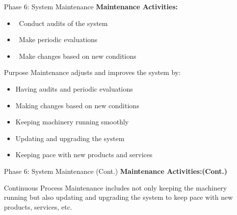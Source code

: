 \documentclass[aspectratio=169]{beamer}
\begin{document}
\begin{frame}{Phase 6: System Maintenance}
    \textbf{Maintenance Activities:}
    \begin{itemize}
        \item\, Conduct audits of the system
        \item\, Make periodic evaluations
        \item \faServer\, Make changes based on new conditions
    \end{itemize} 
    \begin{block}{Purpose}
        Maintenance adjusts and improves the system by:
        \begin{itemize}
            \item Having audits and periodic evaluations
            \item Making changes based on new conditions
            \item Keeping machinery running smoothly
            \item Updating and upgrading the system
            \item Keeping pace with new products and services
        \end{itemize}
    \end{block} 
\end{frame}


\begin{frame}{Phase 6: System Maintenance (Cont.)}
    \textbf{Maintenance Activities:(Cont.)}
 
    \begin{alertblock}{Continuous Process}
        Maintenance includes not only keeping the machinery running but also updating and upgrading the system to keep pace with new products, services, etc.
    \end{alertblock}
\end{frame}
\end{document}
